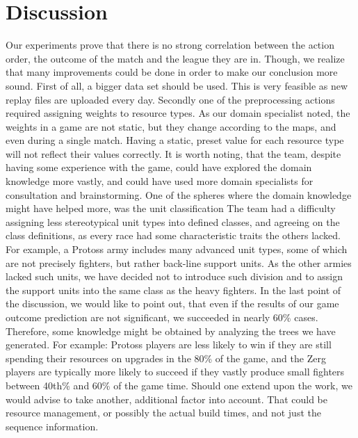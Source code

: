 \documentclass[a4paper,11pt]{article}
\begin{document}
\section{Discussion}
Our experiments prove that there is no strong correlation between the action order, the outcome of the match and the league they are in. Though, we realize that many improvements could be done in order to make our conclusion more sound.
First of all, a bigger data set should be used. This is very feasible as new replay files are uploaded every day.
Secondly one of the preprocessing actions required assigning weights to resource types. As our domain specialist noted, the weights in a game are not static, but they change according to the maps, and even during a single match. Having a static, preset value for each resource type will not reflect their values correctly.
It is worth noting, that the team, despite having some experience with the game, could have explored the domain knowledge more vastly, and could have used more domain specialists for consultation and brainstorming. One of the spheres where the domain knowledge might have helped more, was the unit classification The team had a difficulty assigning less stereotypical unit types into defined classes, and agreeing on the class definitions, as every race had some characteristic traits the others lacked. For example, a Protoss army includes many advanced unit types, some of which are not precisely fighters, but rather back-line support units. As the other armies lacked such units, we have decided not to introduce such division and to assign the support units into the same class as the heavy fighters.
In the last point of the discussion, we would like to point out, that even if the results of our game outcome prediction are not significant, we succeeded in nearly 60\% cases. Therefore, some knowledge might be obtained by analyzing the trees we have generated. For example: Protoss players are less likely to win if they are still spending their resources on upgrades in the 80\% of the game, and the Zerg players are typically more likely to succeed if they vastly produce small fighters between 40th\% and 60\% of the game time.
Should one extend upon the work, we would advise to take another, additional factor into account. That could be resource management, or possibly the actual build times, and not just the sequence information.
\end{document}
